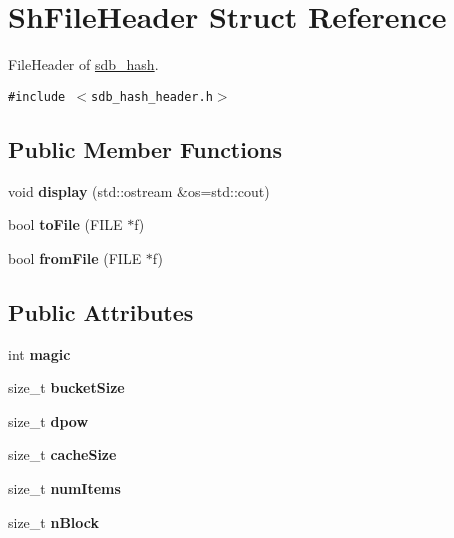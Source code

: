 \hypertarget{structShFileHeader}{
\section{ShFileHeader Struct Reference}
\label{structShFileHeader}
}
FileHeader of \hyperlink{classsdb__hash}{sdb\_\-hash}.  


{\tt \#include $<$sdb\_\-hash\_\-header.h$>$}

\subsection*{Public Member Functions}
\begin{CompactItemize}
\item 
\hypertarget{structShFileHeader_e72562555d56702b9b843cd453d33227}{
void \textbf{display} (std::ostream \&os=std::cout)}
\label{structShFileHeader_e72562555d56702b9b843cd453d33227}

\item 
\hypertarget{structShFileHeader_42d12da07006c4bc76126aed2c7d0acb}{
bool \textbf{toFile} (FILE $\ast$f)}
\label{structShFileHeader_42d12da07006c4bc76126aed2c7d0acb}

\item 
\hypertarget{structShFileHeader_68d65a0a55f43a9fa163a996b06bc3cf}{
bool \textbf{fromFile} (FILE $\ast$f)}
\label{structShFileHeader_68d65a0a55f43a9fa163a996b06bc3cf}

\end{CompactItemize}
\subsection*{Public Attributes}
\begin{CompactItemize}
\item 
\hypertarget{structShFileHeader_1ad9263cd23d28671094a6a9a1f1d734}{
int \textbf{magic}}
\label{structShFileHeader_1ad9263cd23d28671094a6a9a1f1d734}

\item 
\hypertarget{structShFileHeader_c11dce06e778659fa764ff21003453a0}{
size\_\-t \textbf{bucketSize}}
\label{structShFileHeader_c11dce06e778659fa764ff21003453a0}

\item 
\hypertarget{structShFileHeader_bcfafc98d47e19620789cbc93a085f68}{
size\_\-t \textbf{dpow}}
\label{structShFileHeader_bcfafc98d47e19620789cbc93a085f68}

\item 
\hypertarget{structShFileHeader_d38f080419e34336c4b41b6c41c3bef3}{
size\_\-t \textbf{cacheSize}}
\label{structShFileHeader_d38f080419e34336c4b41b6c41c3bef3}

\item 
\hypertarget{structShFileHeader_f5a9cf6ff176e492fac5764fcc0523b1}{
size\_\-t \textbf{numItems}}
\label{structShFileHeader_f5a9cf6ff176e492fac5764fcc0523b1}

\item 
\hypertarget{structShFileHeader_48260cd93890486f6d1a2c3d750b5897}{
size\_\-t \textbf{nBlock}}
\label{structShFileHeader_48260cd93890486f6d1a2c3d750b5897}

\end{CompactItemize}


